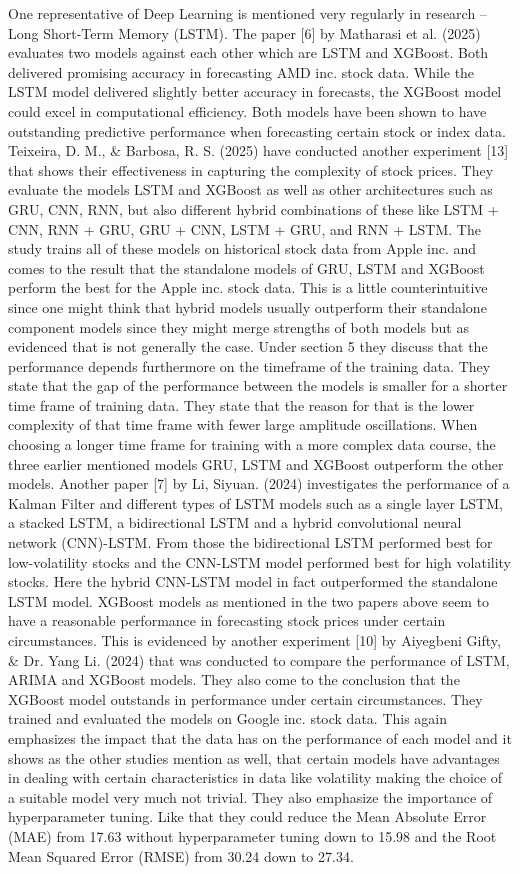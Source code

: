 \documentclass[a4paper,12pt]{report}
\begin{document}
One representative of Deep Learning is mentioned very regularly in research – Long Short-Term Memory (LSTM). The paper [6] by Matharasi et al. (2025) evaluates two models against each other which are LSTM and XGBoost. Both delivered promising accuracy in forecasting AMD inc. stock data. While the LSTM model delivered slightly better accuracy in forecasts, the XGBoost model could excel in computational efficiency. Both models have been shown to have outstanding predictive performance when forecasting certain stock or index data. Teixeira, D. M., \& Barbosa, R. S. (2025) have conducted another experiment [13] that shows their effectiveness in capturing the complexity of stock prices. They evaluate the models LSTM and XGBoost as well as other architectures such as GRU, CNN, RNN, but also different hybrid combinations of these like LSTM + CNN, RNN + GRU, GRU + CNN, LSTM + GRU, and RNN + LSTM. The study trains all of these models on historical stock data from Apple inc. and comes to the result that the standalone models of GRU, LSTM and XGBoost perform the best for the Apple inc. stock data. This is a little counterintuitive since one might think that hybrid models usually outperform their standalone component models since they might merge strengths of both models but as evidenced that is not generally the case. Under section 5 they discuss that the performance depends furthermore on the timeframe of the training data. They state that the gap of the performance between the models is smaller for a shorter time frame of training data. They state that the reason for that is the lower complexity of that time frame with fewer large amplitude oscillations. When choosing a longer time frame for training with a more complex data course, the three earlier mentioned models GRU, LSTM and XGBoost outperform the other models. Another paper [7] by Li, Siyuan. (2024) investigates the performance of a Kalman Filter and different types of LSTM models such as a single layer LSTM, a stacked LSTM, a bidirectional LSTM and a hybrid convolutional neural network (CNN)-LSTM. From those the bidirectional LSTM performed best for low-volatility stocks and the CNN-LSTM model performed best for high volatility stocks. Here the hybrid CNN-LSTM model in fact outperformed the standalone LSTM model. XGBoost models as mentioned in the two papers above seem to have a reasonable performance in forecasting stock prices under certain circumstances. This is evidenced by another experiment [10] by Aiyegbeni Gifty, \& Dr. Yang Li. (2024) that was conducted to compare the performance of LSTM, ARIMA and XGBoost models. They also come to the conclusion that the XGBoost model outstands in performance under certain circumstances. They trained and evaluated the models on Google inc. stock data. This again emphasizes the impact that the data has on the performance of each model and it shows as the other studies mention as well, that certain models have advantages in dealing with certain characteristics in data like volatility making the choice of a suitable model very much not trivial. They also emphasize the importance of hyperparameter tuning. Like that they could reduce the Mean Absolute Error (MAE) from 17.63 without hyperparameter tuning down to 15.98 and the Root Mean Squared Error (RMSE) from 30.24 down to 27.34.\\[0,2cm]
\end{document}
